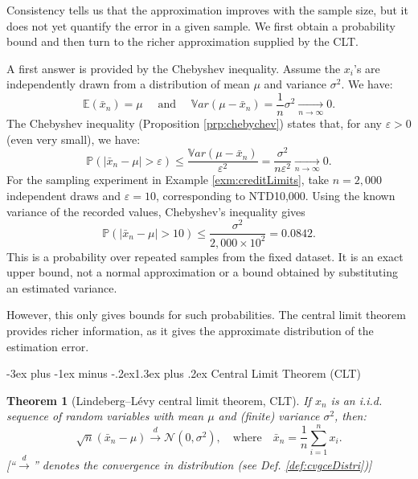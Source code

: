 \documentclass[
  11pt,
]{book}
\makeatletter
\renewcommand\section{\@startsection{section}{1}{\z@}
  {-3ex plus -1ex minus -.2ex}{1.3ex plus .2ex}
  {\normalfont\Large\bfseries\color{TextbookInk}}}
\newtheorem{theorem}{Theorem}[chapter]
\theoremstyle{definition}
\theoremstyle{definition}
\theoremstyle{definition}
\theoremstyle{definition}
\theoremstyle{remark}
\makeatother
\begin{document}
Consistency tells us that the approximation improves with the sample size, but it does not yet quantify the error in a given sample. We first obtain a probability bound and then turn to the richer approximation supplied by the CLT.

A first answer is provided by the Chebyshev inequality. Assume the \(x_i\)'s are independently drawn from a distribution of mean \(\mu\) and variance \(\sigma^2\). We have:
\[
\mathbb{E}(\bar{x}_n) = \mu \quad \mbox{ and } \quad \mathbb{V}ar(\mu - \bar{x}_n) = \frac{1}{n}\sigma^2 \underset{n \rightarrow \infty}{\rightarrow} 0.
\]
The Chebyshev inequality (Proposition \ref{prp:chebychev}) states that, for any \(\varepsilon > 0\) (even very small), we have:
\[
\mathbb{P}(|\bar{x}_n-\mu|>\varepsilon) \le \frac{\mathbb{V}ar(\mu - \bar{x}_n)}{\varepsilon^2} = \frac{\sigma^2}{n\varepsilon^2} \underset{n \rightarrow \infty}{\rightarrow} 0.
\]
For the sampling experiment in Example \ref{exm:creditLimits}, take \(n=2{,}000\) independent draws and \(\varepsilon=10\), corresponding to NTD10,000. Using the known variance of the recorded values, Chebyshev's inequality gives
\[
\mathbb{P}(|\bar{x}_n-\mu|>10)\leq\frac{\sigma^2}{2{,}000\times10^2}
=\text{0.0842}.
\]
This is a probability over repeated samples from the fixed dataset. It is an exact upper bound, not a normal approximation or a bound obtained by substituting an estimated variance.

However, this only gives bounds for such probabilities. The central limit theorem provides richer information, as it gives the approximate distribution of the estimation error.

\section{Central Limit Theorem (CLT)}\label{central-limit-theorem-clt}

\begin{theorem}[Lindeberg–Lévy central limit theorem, CLT]
\protect\hypertarget{thm:LindbergLevyCLT}{}\label{thm:LindbergLevyCLT}If \(x_n\) is an i.i.d. sequence of random variables with mean \(\mu\) and (finite) variance \(\sigma^2\), then:
\[
\boxed{\sqrt{n} (\bar{x}_n - \mu) \overset{d}{\rightarrow} \mathcal{N}(0,\sigma^2), \quad \mbox{where} \quad \bar{x}_n = \frac{1}{n} \sum_{i=1}^{n} x_i.}
\]
{[}``\(\overset{d}{\rightarrow}\)'' denotes the convergence in distribution (see Def. \ref{def:cvgceDistri}){]}
\end{theorem}
\end{document}
